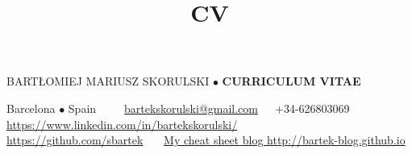 \documentclass[a4paper, oneside]{scrreprt}
\title{CV}
\author{}
\date{}
\begin{document}
\noindent BARTŁOMIEJ MARIUSZ SKORULSKI $\bullet$ \textbf{CURRICULUM VITAE}

\vspace{-0.3cm}
\noindent\makebox[\linewidth]{\rule{\textwidth}{0.4pt}}


\noindent\llap{\FA \faHome\ \ } Barcelona $\bullet$ Spain\ \
{\FA \faEnvelope\ \ }\ \href{mailto:bartekskorulski@gmail.com}{bartekskorulski@gmail.com}\ \ 
{\FA \faMobilePhone}\  +34-626803069\\
\noindent\llap{\FA \faLinkedin\ \ } 
\href{https://www.linkedin.com/in/bartekskorulski/}{https://www.linkedin.com/in/bartekskorulski/}\\
\noindent\llap{\FA \faGithub\ \ } \href{https://github.com/sbartek}{https://github.com/sbartek}\ \ 
{\FA \faStickyNote\ } 
\href{http://bartek-blog.github.io/}{My cheat sheet blog http://bartek-blog.github.io}

\end{document}
